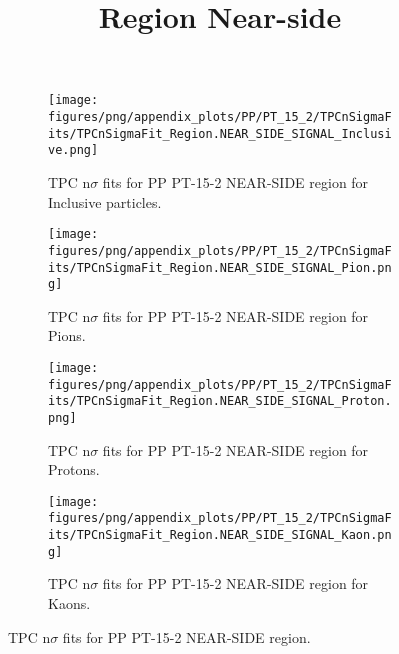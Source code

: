             \begin{figure}[H]
                \title{Region Near-side}
                \begin{subfigure}[b]{0.5\textwidth}
                    \centering
                    \texttt{[image: figures/png/appendix\_plots/PP/PT\_15\_2/TPCnSigmaFits/TPCnSigmaFit\_Region.NEAR\_SIDE\_SIGNAL\_Inclusive.png]}
                    \caption{TPC n$\sigma$ fits for PP PT-15-2 NEAR-SIDE region for Inclusive particles.}
                    \label{fig:appendix_PP_PT-15-2_NEAR_SIDE_SIGNAL_Inclusive}
                \end{subfigure}
                \begin{subfigure}[b]{0.5\textwidth}
                    \centering
                    \texttt{[image: figures/png/appendix\_plots/PP/PT\_15\_2/TPCnSigmaFits/TPCnSigmaFit\_Region.NEAR\_SIDE\_SIGNAL\_Pion.png]}
                    \caption{TPC n$\sigma$ fits for PP PT-15-2 NEAR-SIDE region for Pions.}
                    \label{fig:appendix_PP_PT-15-2_NEAR_SIDE_SIGNAL_Pion}
                \end{subfigure}
                \begin{subfigure}[b]{0.5\textwidth}
                    \centering
                    \texttt{[image: figures/png/appendix\_plots/PP/PT\_15\_2/TPCnSigmaFits/TPCnSigmaFit\_Region.NEAR\_SIDE\_SIGNAL\_Proton.png]}
                    \caption{TPC n$\sigma$ fits for PP PT-15-2 NEAR-SIDE region for Protons.}
                    \label{fig:appendix_PP_PT-15-2_NEAR_SIDE_SIGNAL_Proton}
                \end{subfigure}
                \begin{subfigure}[b]{0.5\textwidth}
                    \centering
                    \texttt{[image: figures/png/appendix\_plots/PP/PT\_15\_2/TPCnSigmaFits/TPCnSigmaFit\_Region.NEAR\_SIDE\_SIGNAL\_Kaon.png]}
                    \caption{TPC n$\sigma$ fits for PP PT-15-2 NEAR-SIDE region for Kaons.}
                    \label{fig:appendix_PP_PT-15-2_NEAR_SIDE_SIGNAL_Kaon}
                \end{subfigure}
                \caption{TPC n$\sigma$ fits for PP PT-15-2 NEAR-SIDE region.}
                \label{fig:appendix_PP_PT-15-2_NEAR_SIDE_SIGNAL}
            \end{figure}
